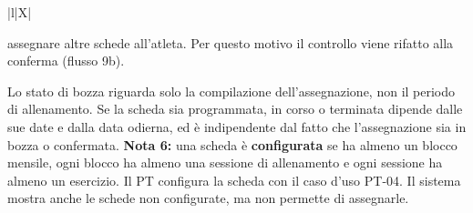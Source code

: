 \documentclass[../../../../SoftwareRequirementsSpecification.tex]{subfiles}
\begin{document}
\begin{xltabular}{\textwidth}{|l|X|}
{\begin{itemize}
        assegnare altre schede all'atleta. Per questo motivo il
        controllo viene rifatto alla conferma (flusso 9b).
    \end{itemize}
    Lo stato di bozza riguarda solo la compilazione
    dell'assegnazione, non il periodo di allenamento. Se la scheda
    sia programmata, in corso o terminata dipende dalle sue date e
    dalla data odierna, ed è indipendente dal fatto che
    l'assegnazione sia in bozza o confermata.\newline
    \textbf{Nota 6:} una scheda è \textbf{configurata} se ha almeno
    un blocco mensile, ogni blocco ha almeno una sessione di
    allenamento e ogni sessione ha almeno un esercizio. Il PT
    configura la scheda con il caso d'uso PT-04. Il sistema mostra
    anche le schede non configurate, ma non permette di assegnarle.
  } \\ \hline
\end{xltabular}
\end{document}
